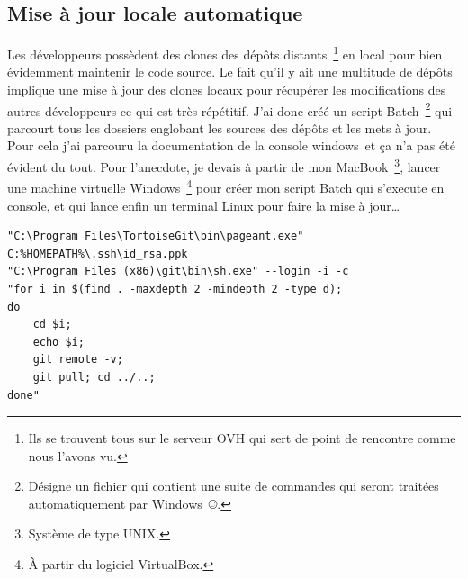 
\subsection{Mise à jour locale automatique} %

Les développeurs possèdent des clones des dépôts distants\, \footnote{Ils se
trouvent tous sur le serveur OVH qui sert de point de rencontre comme nous
l'avons vu.} en local pour bien évidemment maintenir le code source. Le fait
qu'il y ait une multitude de dépôts implique une mise à jour des clones locaux
pour récupérer les modifications des autres développeurs ce qui est très
répétitif. J'ai donc créé un script Batch\, \footnote{Désigne un fichier qui
contient une suite de commandes qui seront traitées automatiquement par
Windows\, \copyright.} qui parcourt tous les dossiers englobant les sources des
dépôts et les mets à jour. Pour cela j'ai parcouru la documentation de la
console windows\, et ça n'a pas été évident du tout. Pour l'anecdote, je devais
à partir de mon MacBook\, \footnote{Système de type UNIX.}, lancer une machine
virtuelle Windows\, \footnote{À partir du logiciel VirtualBox.} pour créer mon
script Batch qui s'execute en console, et qui lance enfin un terminal Linux
pour faire la mise à jour\dots\\

\begin{lstlisting}[basicstyle=\ttfamily\small, frame=trBL]
"C:\Program Files\TortoiseGit\bin\pageant.exe"
C:%HOMEPATH%\.ssh\id_rsa.ppk
"C:\Program Files (x86)\git\bin\sh.exe" --login -i -c
"for i in $(find . -maxdepth 2 -mindepth 2 -type d);
do
    cd $i;
    echo $i;
    git remote -v;
    git pull; cd ../..;
done"
\end{lstlisting}

\clearpage
